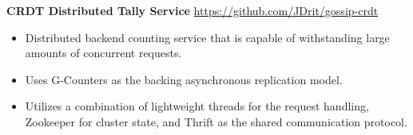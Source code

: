 \documentclass[overlapped,line]{resume}
\newcommand{\rurl}[1]{\hfill {\footnotesize \url{#1}}}
\begin{document}
\begin{resume}
  \textbf{CRDT Distributed Tally Service} \rurl{https://github.com/JDrit/gossip-crdt}
  \begin{itemize}
    \item Distributed backend counting service that is capable of withstanding large amounts of
      concurrent requests.
    \item Uses G-Counters as the backing asynchronous replication model.
    \item Utilizes a combination of lightweight threads for the request handling, Zookeeper for
      cluster state, and Thrift as the shared communication protocol.
  \end{itemize}

\end{resume}
\end{document}
